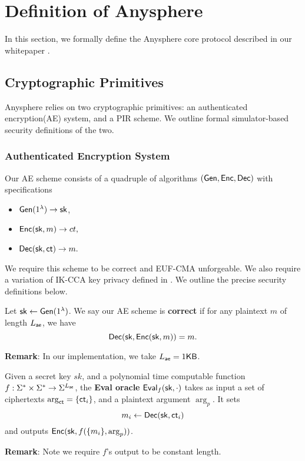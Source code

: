 \section{Definition of Anysphere}
\label{sec:asphr-defn}
In this section, we formally define the Anysphere core protocol described in our whitepaper \cite{whitepaper}. 
\subsection{Cryptographic Primitives}
Anysphere relies on two cryptographic primitives: an authenticated encryption(AE) system, and a PIR scheme. We outline formal simulator-based security definitions of the two. 

\subsubsection{Authenticated Encryption System}
\label{subsec:AE}
Our AE scheme consists of a quadruple of algorithms $(\mathsf{Gen}, \mathsf{Enc}, \mathsf{Dec})$ with specifications
\begin{itemize}
    \item $\mathsf{Gen}(1^{\lambda}) \to {\ensuremath{\mathsf{sk}}}$,
    \item $\mathsf{Enc}({\mathsf{sk}}, m) \to ct,$
    \item $\mathsf{Dec}({\mathsf{sk}}, \mathsf{ct}) \to m.$
\end{itemize}
We require this scheme to be correct and EUF-CMA unforgeable. We also require a variation of IK-CCA key privacy defined in \cite{BBDP01keyprivate}. We outline the precise security definitions below.

\begin{definition}
\label{defn:AE-correctness}
Let ${\mathsf{sk}} \leftarrow \mathsf{Gen}(1^{\lambda})$. We say our AE scheme is \textbf{correct} if for any plaintext $m$ of length $L_{\mathsf{ae}}$, we have
$$\mathsf{Dec}({\mathsf{sk}}, \mathsf{Enc}({\mathsf{sk}}, m)) = m.$$
\end{definition}
\textbf{Remark}: In our implementation, we take $L_{\mathsf{ae}} = 1 \mathsf{KB}$.

\begin{definition}
\label{defn:AE-eval-oracle}
Given a secret key $sk$, and a polynomial time computable function $f: \Sigma^* \times \Sigma^* \to \Sigma^{L_{\mathsf{ae}}}$, the \textbf{Eval oracle} $\mathsf{Eval}_{f}({\mathsf{sk}}, \cdot)$ takes as input a set of ciphertexts $\arg_{\mathsf{ct}} = \{\mathsf{ct}_i\}$, and a plaintext argument $\arg_{p}$. It sets 
$$m_i \leftarrow \mathsf{Dec}({\mathsf{sk}}, \mathsf{ct}_i)$$ 
and outputs $\mathsf{Enc}({\mathsf{sk}}, f(\{m_i\}, \arg_p))$.
\end{definition}
\textbf{Remark}: Note we require $f$'s output to be constant length. 


